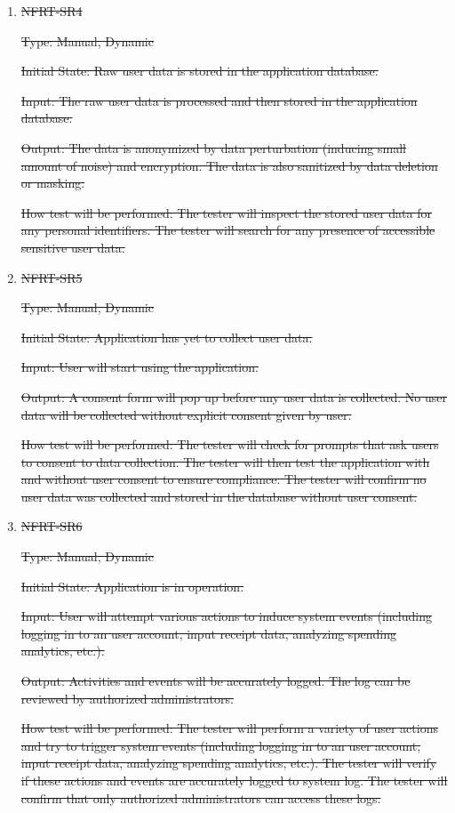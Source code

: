 \documentclass[12pt, titlepage]{article}
\begin{document}
\begin{enumerate}
\item{\sout{NFRT-SR4\\}}

\sout{Type: Manual, Dynamic}

\sout{Initial State: Raw user data is stored in the application database.}
                
\sout{Input: The raw user data is processed and then stored in the application database.}
                
\sout{Output: The data is anonymized by data perturbation (inducing small amount of noise) and encryption. The data is also sanitized by data deletion or masking.}
                
\sout{How test will be performed: The tester will inspect the stored user data for any personal identifiers. The tester will search for any presence of accessible sensitive user data.}

\item{\sout{NFRT-SR5\\}}

\sout{Type: Manual, Dynamic}

\sout{Initial State: Application has yet to collect user data.}
                
\sout{Input: User will start using the application.}
                
\sout{Output: A consent form will pop up before any user data is collected. No user data will be collected without explicit consent given by user.}
                
\sout{How test will be performed: The tester will check for prompts that ask users to consent to data collection. The tester will then test the application with and without user consent to ensure compliance. The tester will confirm no user data was collected and stored in the database without user consent.}

\item{\sout{NFRT-SR6\\}}

\sout{Type: Manual, Dynamic}

\sout{Initial State: Application is in operation.}
                
\sout{Input: User will attempt various actions to induce system events (including logging in to an user account, input receipt data, analyzing spending analytics, etc.).}
                
\sout{Output: Activities and events will be accurately logged. The log can be reviewed by authorized administrators.}
                
\sout{How test will be performed: The tester will perform a variety of user actions and try to trigger system events (including logging in to an user account, input receipt data, analyzing spending analytics, etc.). The tester will verify if these actions and events are accurately logged to system log. The tester will confirm that only authorized administrators can access these logs.}

\end{enumerate}
\end{document}
